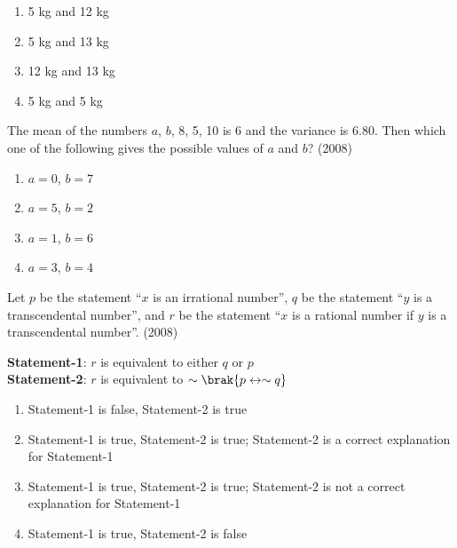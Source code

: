         \begin{multicols}{2}
            \begin{enumerate}
                \item 5 kg and 12 kg
                \item 5 kg and 13 kg
                \item 12 kg and 13 kg
                \item 5 kg and 5 kg
            \end{enumerate} 
        \end{multicols}

    \item The mean of the numbers $a$, $b$, 8, 5, 10 is 6 and
        the variance is $6.80$. Then which one of the following
        gives the possible values of $a$ and $b$?
        \hfill (2008)

        \begin{multicols}{2}
            \begin{enumerate}
                \item $a = 0$, $b = 7$
                \item $a = 5$, $b = 2$
                \item $a = 1$, $b = 6$
                \item $a = 3$, $b = 4$
            \end{enumerate}
        \end{multicols}

    \item Let $p$ be the statement ``$x$ is an irrational number'',
        $q$ be the statement ``$y$ is a transcendental number'',
        and $r$ be the statement ``$x$ is a rational number if
        $y$ is a transcendental number''.
        \hfill (2008)

        \textbf{Statement-1}: $r$ is equivalent to either $q$ or $p$ \\
        \textbf{Statement-2}: $r$ is equivalent to $\sim \brak{p \leftrightarrow \sim q}$

        \begin{enumerate}
            \item Statement-1 is false, Statement-2 is true
            \item Statement-1 is true, Statement-2 is true;
                Statement-2 is a correct explanation for Statement-1
            \item Statement-1 is true, Statement-2 is true;
                Statement-2 is not a correct explanation for Statement-1
            \item Statement-1 is true, Statement-2 is false
        \end{enumerate}


